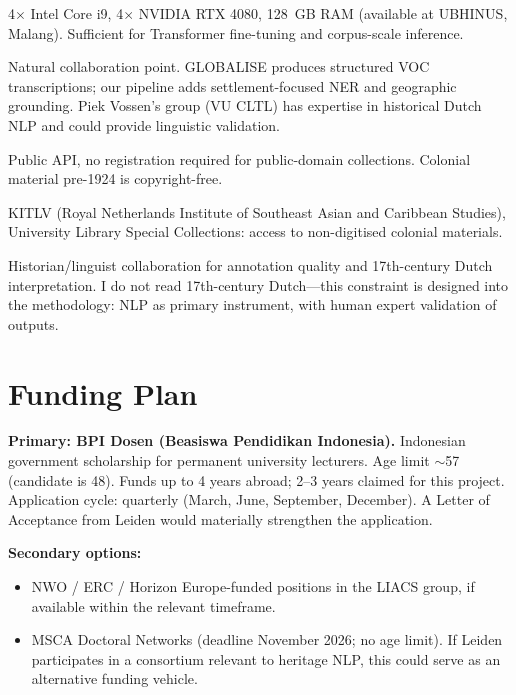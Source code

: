 \documentclass[11pt,a4paper]{article}
\begin{document}
\begin{description}[style=nextline,leftmargin=1em]
  \item[Compute] 4$\times$ Intel Core i9, 4$\times$ NVIDIA RTX 4080, 128~GB RAM (available at UBHINUS, Malang). Sufficient for Transformer fine-tuning and corpus-scale inference.
  \item[GLOBALISE] Natural collaboration point. GLOBALISE produces structured VOC transcriptions; our pipeline adds settlement-focused NER and geographic grounding. Piek Vossen's group (VU CLTL) has expertise in historical Dutch NLP and could provide linguistic validation.
  \item[Delpher.nl] Public API, no registration required for public-domain collections. Colonial material pre-1924 is copyright-free.
  \item[Leiden libraries] KITLV (Royal Netherlands Institute of Southeast Asian and Caribbean Studies), University Library Special Collections: access to non-digitised colonial materials.
  \item[Domain validation] Historian/linguist collaboration for annotation quality and 17th-century Dutch interpretation. I do not read 17th-century Dutch---this constraint is designed into the methodology: NLP as primary instrument, with human expert validation of outputs.
\end{description}

\section{Funding Plan}

\textbf{Primary: BPI Dosen (Beasiswa Pendidikan Indonesia).} Indonesian government scholarship for permanent university lecturers. Age limit $\sim$57 (candidate is 48). Funds up to 4 years abroad; 2--3 years claimed for this project. Application cycle: quarterly (March, June, September, December). A Letter of Acceptance from Leiden would materially strengthen the application.

\textbf{Secondary options:}
\begin{itemize}[nosep]
  \item NWO / ERC / Horizon Europe-funded positions in the LIACS group, if available within the relevant timeframe.
  \item MSCA Doctoral Networks (deadline November 2026; no age limit). If Leiden participates in a consortium relevant to heritage NLP, this could serve as an alternative funding vehicle.
\end{itemize}
\end{document}
